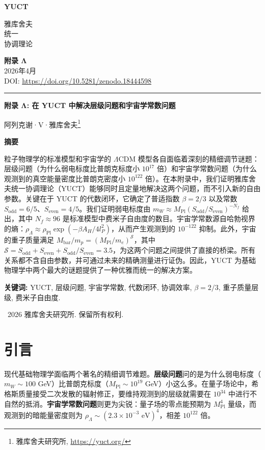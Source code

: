 \documentclass[11pt,a4paper]{article}
\theoremstyle{remark}
\newcommand{\makeheader}{%
	\noindent
	\begin{minipage}{0.17\textwidth}
		\raggedright
		{\sffamily\bfseries\color{skyblue}\fontsize{46}{46}\selectfont YUCT}%
	\end{minipage}%
	\hspace{30pt}
	\begin{minipage}{0.32\textwidth}
		\raggedright
		{\sffamily\fontsize{11}{13}\selectfont 雅库舍夫\\ 统一\\ 协调理论}%
	\end{minipage}%
	\hfill
	\begin{minipage}{0.38\textwidth}
		\raggedleft
		{\sffamily\bfseries 附录 Λ}\\
		{\sffamily 2026年4月}\\
		{\sffamily\footnotesize DOI: \url{https://doi.org/10.5281/zenodo.18444598}}%
	\end{minipage}
	\par\vspace{5pt}
	\noindent\textcolor{gold}{\rule{\textwidth}{1.6pt}}
	\par\vspace{0pt}
}
\begin{document}
	\renewcommand{\thepage}{\arabic{page}}
	\thispagestyle{firstpage}
	\makeheader
	
	\vspace{0cm}
	{\LARGE\bfseries 附录 Λ: 在 YUCT 中解决层级问题和宇宙学常数问题 \par}
	\vspace{0.2cm}
	
	{\large 阿列克谢·V·雅库舍夫\footnote{雅库舍夫研究所, \url{https://yuct.org/}}} \\
	\vspace{0.0cm}
	
	{\color{darkblue}\textbf{\LARGE 摘要}} \par
	{\large
		\noindent
		粒子物理学的标准模型和宇宙学的 \(\Lambda\)CDM 模型各自面临着深刻的精细调节谜题：层级问题（为什么弱电标度比普朗克标度小 \(10^{17}\) 倍）和宇宙学常数问题（为什么观测到的真空能量密度比普朗克密度小 \(10^{122}\) 倍）。在本附录中，我们证明雅库舍夫统一协调理论（YUCT）能够同时且定量地解决这两个问题，而不引入新的自由参数。关键在于 YUCT 的代数闭环，它确定了普适指数 \(\beta = 2/3\) 以及常数 \(S_{\mathrm{odd}} = 6/5\)、\(S_{\mathrm{even}} = 4/5\)。我们证明弱电标度由 \(m_W \approx M_{\mathrm{Pl}} (S_{\mathrm{odd}}/S_{\mathrm{even}})^{-N_f}\) 给出，其中 \(N_f \approx 96\) 是标准模型中费米子自由度的数目。宇宙学常数源自哈勃视界的熵：\(\rho_\Lambda \approx \rho_{\mathrm{Pl}} \exp(-\beta A_H / 4l_P^2)\)，从而产生观测到的 \(10^{-122}\) 抑制。此外，宇宙的重子质量满足 \(M_{\mathrm{bar}}/m_p = (M_{\mathrm{Pl}}/m_e)^{\mathcal{S}}\)，其中 \(\mathcal{S} = S_{\mathrm{odd}} + S_{\mathrm{even}} + S_{\mathrm{odd}}/S_{\mathrm{even}} = 3.5\)，为这两个问题之间提供了直接的桥梁。所有关系都不含自由参数，并可通过未来的精确测量进行证伪。因此，YUCT 为基础物理学中两个最大的谜题提供了一种优雅而统一的解决方案。
	}
	
	\vspace{0.1cm}
	\noindent
	{\color{darkblue}\textbf{关键词:}} YUCT, 层级问题, 宇宙学常数, 代数闭环, 协调效率, \(\beta = 2/3\), 重子质量层级, 费米子自由度.
	
	\vspace{0.5cm}
	\noindent
	\textcopyright\ 2026 雅库舍夫研究所. 保留所有权利.
	
	\tableofcontents
	\newpage
	
	\section{引言}
	
	现代基础物理学面临两个著名的精细调节难题。\textbf{层级问题}问的是为什么弱电标度（\(m_W \sim 100\) GeV）比普朗克标度（\(M_{\mathrm{Pl}} \sim 10^{19}\) GeV）小这么多。在量子场论中，希格斯质量接受二次发散的辐射修正，要维持观测到的层级就需要在 \(10^{34}\) 中进行不自然的抵消。\textbf{宇宙学常数问题}则更为尖锐：量子场的零点能预期为 \(M_{\mathrm{Pl}}^4\) 量级，而观测到的暗能量密度则为 \(\rho_\Lambda \sim (2.3 \times 10^{-3} \text{ eV})^4\)，相差 \(10^{122}\) 倍。
	
\end{document}
